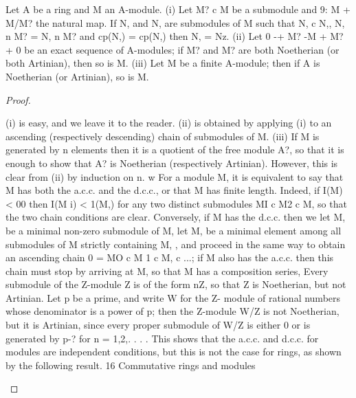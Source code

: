 \begin{theorem}[Theorem 3.1]\label{mcrt-auto-theorem-3-1}\uses{}
\begin{mathematicalrecord}
Let A be a ring and M an A-module.
  (i) Let M? c M be a submodule and 9: M + M/M? the natural map. If
N, and N, are submodules of M such that N, c N,, N, n M? = N, n M?
and cp(N,) = cp(N,) then N, = Nz.
   (ii) Let 0 -+ M? -M      + M? + 0 be an exact sequence of A-modules;
if M? and M? are both Noetherian (or both Artinian), then so is M.
   (iii) Let M be a finite A-module; then if A is Noetherian (or Artinian),
so is M.
\end{mathematicalrecord}
\end{theorem}
\begin{proof}
\begin{mathematicalrecord}
(i) is easy, and we leave it to the reader.
   (ii) is obtained by applying (i) to an ascending (respectively descending)
chain of submodules of M.
   (iii) If M is generated by n elements then it is a quotient of the free module
A?, so that it is enough to show that A? is Noetherian (respectively Artinian).
However, this is clear from (ii) by induction on n. w
   For a module M, it is equivalent to say that M has both the a.c.c. and
the d.c.c., or that M has finite length. Indeed, if I(M) < 00 then I(M i) < 1(M,)
for any two distinct submodules MI c M2 c M, so that the two chain
conditions are clear. Conversely, if M has the d.c.c. then we let M, be a
minimal non-zero submodule of M, let M, be a minimal element among all
submodules of M strictly containing M, , and proceed in the same way to
obtain an ascending chain 0 = MO c M 1 c M, c ...; if M also has the a.c.c.
then this chain must stop by arriving at M, so that M has a composition
series,
   Every submodule of the Z-module Z is of the form nZ, so that Z is
Noetherian, but not Artinian. Let p be a prime, and write W for the Z-
module of rational numbers whose denominator is a power of p; then
the Z-module W/Z is not Noetherian, but it is Artinian, since every proper
submodule of W/Z is either 0 or is generated by p-? for n = 1,2,. . . . This
shows that the a.c.c. and d.c.c. for modules are independent conditions,
but this is not the case for rings, as shown by the following result.
16         Commutative        rings and modules
\end{mathematicalrecord}
\end{proof}


